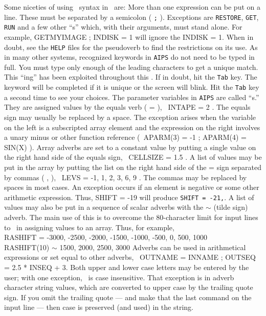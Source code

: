      Some niceties of using \POPS\ syntax in \AIPS\ are:
\xben
\Item More than one expression can be put on a line.  These
    must be separated by a semicolon ( {\tt ;} ).
   Exceptions are {\tt RESTORE}, {\tt GET}, {\tt RUN} and a few other
   ``s'' which, with their arguments, must stand
   alone.  For example, {\us GET\qs MYIMAGE ; INDISK = 1 \CR} will
   ignore the {\us INDISK = 1}. When in doubt, see the {\tt HELP}
   files for the pseudoverb to find the restrictions on its use.
\Item As in many other systems, recognized keywords in {\tt AIPS}
   do not need to be typed in full.  You must type only enough of the
   leading characters to get a unique match.  This
   ``ing'' has been exploited throughout this
   \Cookbook.  If in doubt, hit the {\tt Tab} key.  The keyword will
   be completed if it is unique or the screen will blink.  Hit the
   {\tt Tab} key a second time to see your choices.
\Item The parameter variables in {\tt AIPS} are called
   ``s.''  They are assigned values by the equals verb (
    {\us =} ), \eg\ {\us INTAPE = 2 \hbox{\CR}}.  The equals sign may
    usually be replaced by a space.  The exception arises when the
    variable on the left is a subscripted array element and the
    expression on the right involves a unary minus or other function
    reference (\eg\ {\us APARM(3) = -1 ; APARM(4) = SIN(X) \CR}).
\Item Array adverbs are set to a constant value by putting a single
   value on the right hand side of the equals sign, \eg\ {\us CELLSIZE =
   1.5 \hbox{\CR}}.  A list of values may be put in the array by
   putting the list on the right hand side of the {\us =} sign
   separated by commas ( {\us ,} ), \eg\ {\us LEVS = -1, 1, 2, 3, 6, 9
   \hbox{\CR}}.  The commas may be replaced by spaces in most cases.
   An exception occurs if an element is negative or some other
   arithmetic expression.  Thus, {\us SHIFT = -19 \CR} will
   produce {\tt SHIFT = -21,}.
\Item A list of values may also be put in a sequence of scalar adverbs
   with the $\sim$ (tilde sign) adverb.  The main use of this is to
   overcome the 80-character limit for input lines to \POPS\ in
   assigning values to an array.  Thus, for example,\\
   {\us RASHIFT = -3000, -2500, -2000, -1500, -1000, -500, 0, 500,
        1000 \CR}\\
   {\us RASHIFT(10) $\sim$ 1500, 2000, 2500, 3000 \CR}
\Item Adverbs can be used in arithmetical expressions or set equal to
   other adverbs, \eg\ {\us OUTNAME = INNAME ; OUTSEQ = 2.5 * INSEQ + 3}.
\Item Both upper and lower case letters may be entered by the user;
   with one exception, \AIPS\ is case insensitive.  That exception is
   in adverb character string values, which are converted to upper
   case by the trailing quote sign.  If you omit the trailing quote
   --- and make that the last command on the input line --- then case
   is preserved (and used) in the string.
\xeen

